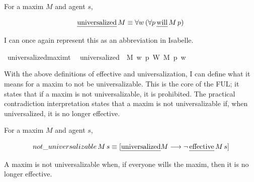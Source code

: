 \begin{isabellebody}
\begin{isamarkuptext}
\begin{definition}[Universalized]
  For a maxim $M$ and agent $s$,

  $$\text{\emph{universalized}} \, M  \equiv \forall w \, (\forall p \, \text{\emph{will}} \, M \, p)$$
\end{definition}

I can once again represent this as an abbreviation in Isabelle.%
\end{isamarkuptext}\isamarkuptrue%
\isamarkupfalse%
\ universalized{\isacharcolon}{\isacharcolon}{\isachardoublequoteopen}maxim{\isasymRightarrow}t{\isachardoublequoteclose}\ \ \isanewline
{\isachardoublequoteopen}universalized\ {\isasymequiv}\ {\isasymlambda}M{\isachardot}\ {\isacharparenleft}{\isasymlambda}w{\isachardot}\ {\isacharparenleft}{\isasymforall}p{\isachardot}\ {\isacharparenleft}W\ M\ p{\isacharparenright}\ w{\isacharparenright}{\isacharparenright}{\isachardoublequoteclose}\isanewline
%
\isanewline
%
\begin{isamarkuptext}%
With the above definitions of effective and universalization, I can define what it means for 
a maxim to not be universalizable. This is the core of the FUL; it states that if a maxim is not 
universalizable, it is prohibited. The practical contradiction interpretation states that a  maxim is 
not universalizable if, when universalized, it is no longer effective.

\begin{definition}
For a maxim $M$ and agent $s$,

$$not\_universalizable \, M \, s  \equiv [ \text{\emph{universalized}} M \longrightarrow \neg \, \text{\emph{effective}} \, M \, s ]$$

A maxim is not universalizable when, if everyone wills the maxim, then it is no longer effective.
\end{definition}


\end{isamarkuptext}
\end{isabellebody}
